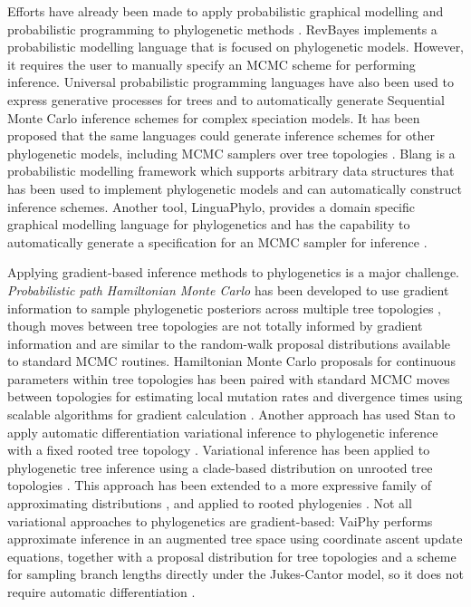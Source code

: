 \documentclass{article}
\begin{document}
Efforts have already been made to apply probabilistic graphical modelling and probabilistic programming to phylogenetic methods
\cite{hohna2014probabilistic, fourment2019evaluating, ronquist2021universal, drummond2023linguaphylo}. RevBayes \cite{hohna2016revbayes} implements a probabilistic modelling language that is focused on phylogenetic models. However, it requires the user to manually specify an MCMC scheme for performing inference. Universal probabilistic programming languages have also been used to express generative processes for trees and to automatically generate Sequential Monte Carlo inference schemes for complex speciation models. It has been proposed that the same languages could generate inference schemes for other phylogenetic models, including MCMC samplers over tree topologies \cite{ronquist2021universal, senderov2024treeppl}. Blang \cite{bouchard2022blang} is a probabilistic modelling framework which supports arbitrary data structures that has been used to implement phylogenetic models and can automatically construct inference schemes. Another tool, LinguaPhylo, provides a domain specific graphical modelling language for phylogenetics and has the capability to automatically generate a specification for an MCMC sampler for inference \cite{drummond2023linguaphylo}.

Applying gradient-based inference methods to phylogenetics is a major challenge. \textit{Probabilistic path Hamiltonian Monte Carlo} has been developed to use gradient information to sample phylogenetic posteriors across multiple tree topologies \cite{dinh2017probabilistic}, though moves between tree topologies are not totally informed by gradient information and are similar to the random-walk proposal distributions available to standard MCMC routines. Hamiltonian Monte Carlo proposals for continuous parameters within tree topologies has been paired with standard MCMC moves between topologies for estimating local mutation rates and divergence times using scalable algorithms for gradient calculation \cite{fisher2023shrinkage, ji2023scalable}. Another approach has used Stan to apply automatic differentiation variational inference to phylogenetic inference with a fixed rooted tree topology \cite{fourment2019evaluating}. Variational inference has been applied to phylogenetic tree inference using a clade-based distribution on unrooted tree topologies \cite{zhang2018variational}. This approach has been extended to a more expressive family of approximating distributions \cite{zhang2020improved}, and applied to rooted phylogenies \cite{zhang2022variational}. Not all variational approaches to phylogenetics are gradient-based: VaiPhy performs approximate inference in an augmented tree space using coordinate ascent update equations, together with a proposal distribution for tree topologies and a scheme for sampling branch lengths directly under the Jukes-Cantor model, so it does not require automatic differentiation \cite{koptagel2022vaiphy}.
\end{document}
